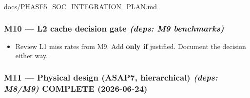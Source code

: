\begin{relocated}{docs/PHASE5_SOC_INTEGRATION_PLAN.md}
\subsubsection{\texorpdfstring{M10 --- L2 cache decision gate
\emph{(deps: M9
benchmarks)}}{M10 --- L2 cache decision gate (deps: M9 benchmarks)}}\label{ds:ch:phase5-soc-integration-plan:m10-l2-cache-decision-gate-deps-m9-benchmarks}

\begin{itemize}
\tightlist
\item
  \hold{} Review L1 miss rates from M9. Add 
  \textbf{only if} justified. Document the decision either way.
\end{itemize}

\subsubsection{\texorpdfstring{M11 --- Physical design (ASAP7,
hierarchical) \emph{(deps: M8/M9)} \ok{} COMPLETE
(2026-06-24)}{M11 --- Physical design (ASAP7, hierarchical) (deps: M8/M9)  COMPLETE (2026-06-24)}}\label{ds:ch:phase5-soc-integration-plan:m11-physical-design-asap7-hierarchical-deps-m8m9-white-check-mark-complete-2026-06-24}


\end{relocated}
